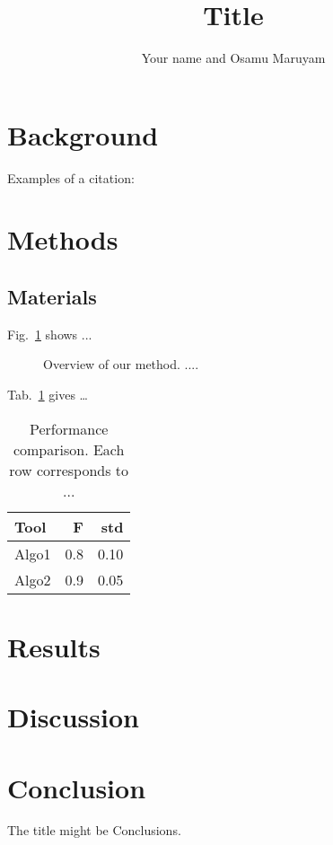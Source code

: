 \documentclass{article}
\begin{document}
    \title{Title}    
    \author{Your name and Osamu Maruyam}
    \maketitle

    \section{Background}

    Examples of a citation: 
    \cite{Narlikar2006Informative}

    \cite{Narlikar2007Nucleosome}

    \section{Methods}

    \subsection{Materials}

    Fig.~\ref{fig:overview} shows ...

    
    \begin{figure}[h]
        \label{fig:overview}
        \caption{Overview of our method. ....}
    \end{figure}
    

    Tab.~\ref{tab:comparison} gives \dots

    \begin{table}[h]
        \begin{center}
            \label{tab:comparison}
            \caption{Performance comparison. Each row corresponds to ... }
            \begin{tabular}{l|rr}
                Tool & F & std \\\hline
                Algo1 & 0.8 & 0.10 \\
                Algo2 & 0.9 & 0.05 
            \end{tabular}
        \end{center}
      \end{table}





    \section{Results}

    \section{Discussion}

    \section{Conclusion}
    The title might be Conclusions. 

    
       
\end{document}
